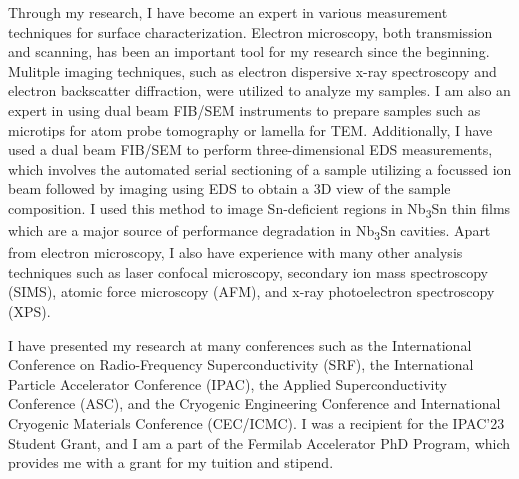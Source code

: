 \documentclass[]{revtex4-2}
\begin{document}
    Through my research, I have become an expert in various measurement techniques for surface characterization. Electron microscopy, both transmission and scanning, has been an important tool for my research since the beginning. Mulitple imaging techniques, such as electron dispersive x-ray spectroscopy and electron backscatter diffraction, were utilized to analyze my samples. I am also an expert in using dual beam FIB/SEM instruments to prepare samples such as microtips for atom probe tomography or lamella for TEM. Additionally, I have used a dual beam FIB/SEM to perform three-dimensional EDS measurements, which involves the automated serial sectioning of a sample utilizing a focussed ion beam followed by imaging using EDS to obtain a 3D view of the sample composition. I used this method to image Sn-deficient regions in Nb\textsubscript{3}Sn thin films which are a major source of performance degradation in Nb\textsubscript{3}Sn cavities. \cite{viklund2023three} Apart from electron microscopy, I also have experience with many other analysis techniques such as laser confocal microscopy, secondary ion mass spectroscopy (SIMS), atomic force microscopy (AFM), and x-ray photoelectron spectroscopy (XPS).

    I have presented my research at many conferences such as the International Conference on Radio-Frequency Superconductivity (SRF), the International Particle Accelerator Conference (IPAC), the Applied Superconductivity Conference (ASC), and the Cryogenic Engineering Conference and International Cryogenic Materials Conference (CEC/ICMC). I was a recipient for the IPAC'23 Student Grant, and I am a part of the Fermilab Accelerator PhD Program, which provides me with a grant for my tuition and stipend.







\newpage



\end{document}
